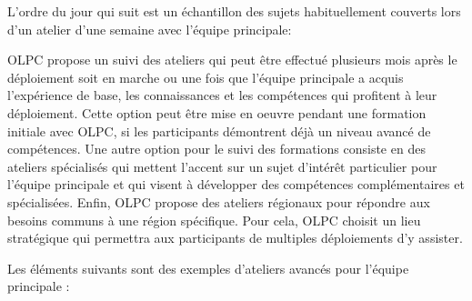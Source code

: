 \documentclass[11pt]{article}
\begin{document}
L'ordre du jour qui suit est un échantillon des sujets habituellement
couverts lors d'un atelier d'une semaine avec l'équipe principale:

OLPC propose un suivi des ateliers qui peut être effectué plusieurs mois
après le déploiement soit en marche ou une fois que l'équipe principale a
acquis l'expérience de base, les connaissances et les compétences qui
profitent à leur déploiement. Cette option peut être mise en oeuvre pendant
une formation initiale avec OLPC, si les participants démontrent déjà un
niveau avancé de compétences. Une autre option pour le suivi des formations
consiste en des ateliers spécialisés qui mettent l'accent sur un sujet
d'intérêt particulier pour l'équipe principale et qui visent à développer
des compétences complémentaires et spécialisées. Enfin, OLPC propose des
ateliers régionaux pour répondre aux besoins communs à une région
spécifique. Pour cela, OLPC choisit un lieu stratégique qui permettra aux
participants de multiples déploiements d'y assister.

Les éléments suivants sont des exemples d'ateliers avancés pour l'équipe
principale :
\end{document}

